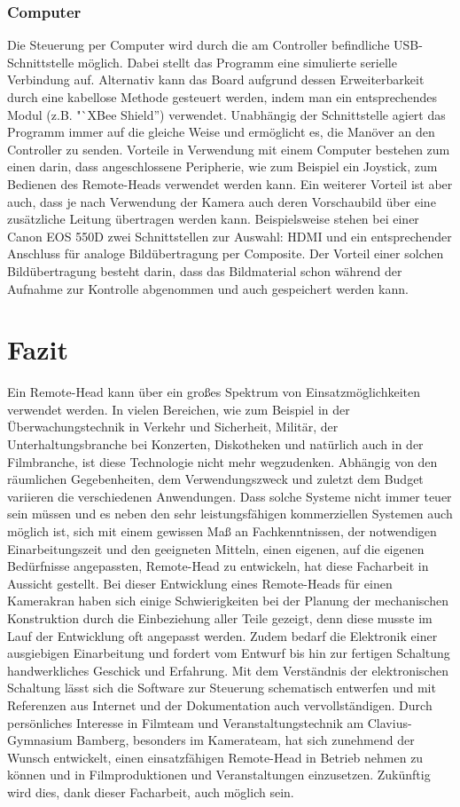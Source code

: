 \documentclass[a4paper, 12pt, bibliography=totocnumbered, listof=numbered]{scrartcl}
\begin{document}
	\subsubsection{Computer}
	Die Steuerung per Computer wird durch die am Controller befindliche USB-Schnittstelle möglich. Dabei stellt das Programm eine simulierte serielle Verbindung auf. Alternativ kann das Board aufgrund dessen Erweiterbarkeit durch eine kabellose Methode gesteuert werden, indem man ein entsprechendes Modul (z.B. "`XBee Shield”) verwendet. Unabhängig der Schnittstelle agiert das Programm immer auf die gleiche Weise und ermöglicht es, die Manöver an den Controller zu senden. Vorteile in Verwendung mit einem Computer bestehen zum einen darin, dass angeschlossene Peripherie, wie zum Beispiel ein Joystick, zum Bedienen des Remote-Heads verwendet werden kann. Ein weiterer Vorteil ist aber auch, dass je nach Verwendung der Kamera auch deren Vorschaubild über eine zusätzliche Leitung übertragen werden kann. Beispielsweise stehen bei einer Canon EOS 550D zwei Schnittstellen zur Auswahl: HDMI und ein entsprechender Anschluss für analoge Bildübertragung per Composite. Der Vorteil einer solchen Bildübertragung besteht darin, dass das Bildmaterial schon während der Aufnahme zur Kontrolle abgenommen und auch gespeichert werden kann.

	\section{Fazit}
	Ein Remote-Head kann über ein großes Spektrum von Einsatzmöglichkeiten verwendet werden. In vielen Bereichen, wie zum Beispiel in der Überwachungstechnik in Verkehr und Sicherheit, Militär, der Unterhaltungsbranche bei Konzerten, Diskotheken und natürlich auch in der Filmbranche, ist diese Technologie nicht mehr wegzudenken.  Abhängig von den räumlichen Gegebenheiten, dem Verwendungszweck und zuletzt dem Budget variieren die verschiedenen Anwendungen. Dass solche Systeme nicht immer teuer sein müssen und es neben den sehr leistungsfähigen kommerziellen Systemen auch möglich ist, sich mit einem gewissen Maß an Fachkenntnissen, der notwendigen Einarbeitungszeit und den geeigneten Mitteln, einen eigenen, auf die eigenen Bedürfnisse angepassten, Remote-Head zu entwickeln, hat diese Facharbeit in Aussicht gestellt. Bei dieser Entwicklung eines Remote-Heads für einen Kamerakran haben sich einige Schwierigkeiten bei der Planung der mechanischen Konstruktion durch die Einbeziehung aller Teile gezeigt, denn diese musste im Lauf der Entwicklung oft angepasst werden. Zudem bedarf die Elektronik einer ausgiebigen Einarbeitung und fordert vom Entwurf bis hin zur fertigen Schaltung handwerkliches Geschick und Erfahrung. Mit dem Verständnis der elektronischen Schaltung lässt sich die Software zur Steuerung schematisch entwerfen und mit Referenzen aus Internet und der Dokumentation auch vervollständigen.
	Durch persönliches Interesse in Filmteam und Veranstaltungstechnik am Clavius-Gymnasium Bamberg, besonders im Kamerateam, hat sich zunehmend der Wunsch entwickelt, einen einsatzfähigen Remote-Head in Betrieb nehmen zu können und in Filmproduktionen und Veranstaltungen einzusetzen. Zukünftig wird dies, dank dieser Facharbeit, auch möglich sein.
\end{document}
